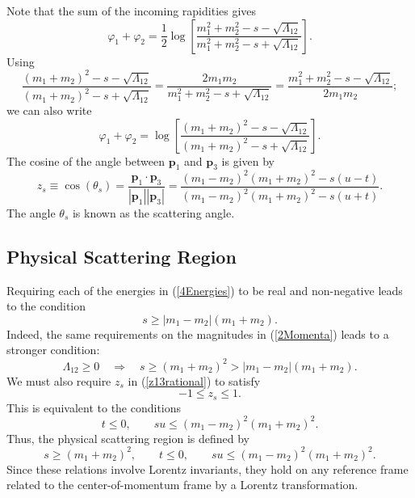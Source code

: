 Note that the sum of the incoming rapidities gives
\begin{equation}
	\varphi_{1} + \varphi_{2} = \frac{1}{2} \log{\left[ \frac{m_{1}^{2} + m_{2}^{2} - s - \sqrt{\Lambda_{12}}}{m_{1}^{2} + m_{2}^{2} - s + \sqrt{\Lambda_{12}}} \right]}.
\end{equation}
Using
\begin{equation}
	\frac{(m_{1} + m_{2})^{2} - s - \sqrt{\Lambda_{12}}}{(m_{1} + m_{2})^{2} - s + \sqrt{\Lambda_{12}}} = \frac{2m_{1}m_{2}}{m_{1}^{2} + m_{2}^{2} - s + \sqrt{\Lambda_{12}}} = \frac{m_{1}^{2} + m_{2}^{2} - s - \sqrt{\Lambda_{12}}}{2m_{1}m_{2}};
\end{equation}
we can also write
\begin{equation}
	\varphi_{1} + \varphi_{2} = \log{\left[ \frac{(m_{1} + m_{2})^{2} - s - \sqrt{\Lambda_{12}}}{(m_{1} + m_{2})^{2} - s + \sqrt{\Lambda_{12}}} \right]}.
	\label{rap12}
\end{equation}
The cosine of the angle between $\mathbf{p}_{1}$ and $\mathbf{p}_{3}$ is given by
\begin{equation}
	z_{s} \equiv \cos(\theta_{s}) = \frac{\mathbf{p}_{1} \cdot \mathbf{p}_{3}}{|\mathbf{p}_{1}| |\mathbf{p}_{3}|} = \frac{(m_{1} - m_{2})^{2} (m_{1} + m_{2})^{2} - s (u - t)}{(m_{1} - m_{2})^{2} (m_{1} + m_{2})^{2} - s (u + t)}.
	\label{z13rational}
\end{equation}
The angle $\theta_{s}$ is known as the scattering angle.
\subsection{Physical Scattering Region}
Requiring each of the energies in (\ref{4Energies}) to be real and non-negative leads to the condition
\begin{equation}
	s \geq |m_{1} - m_{2}| (m_{1} + m_{2}).
\end{equation}
Indeed, the same requirements on the magnitudes in (\ref{2Momenta}) leads to a stronger condition:
\begin{equation}
	\Lambda_{12} \geq 0 \quad \Longrightarrow \quad s \geq (m_{1} + m_{2})^{2} > |m_{1} - m_{2}| (m_{1} + m_{2}).
\end{equation}
We must also require $z_{s}$ in (\ref{z13rational}) to satisfy
\begin{equation}
	{-1} \leq z_{s} \leq 1.
\end{equation}
This is equivalent to the conditions
\begin{equation}
	t \leq 0, \qquad s u \leq (m_{1} - m_{2})^{2} (m_{1} + m_{2})^{2}.
\end{equation}
Thus, the physical scattering region is defined by
\begin{equation}
	s \geq (m_{1} + m_{2})^{2}, \qquad t \leq 0, \qquad s u \leq (m_{1} - m_{2})^{2} (m_{1} + m_{2})^{2}.
\end{equation}
Since these relations involve Lorentz invariants, they hold on any reference frame related to the center-of-momentum frame by a Lorentz transformation.